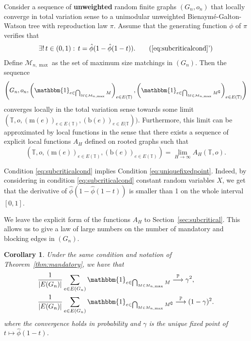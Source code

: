 \documentclass[11pt]{article}
\newtheorem{coro}{Corollary}[section]
\begin{document}
\begin{theorem}\label{thm:mandatory}
    Consider a sequence of \textbf{unweighted} random finite graphs $(G_n,o_n)$ that locally converge in total variation sense to a unimodular unweighted Bienaymé-Galton-Watson tree with reproduction law $\pi$.
    Assume that the generating function $\phi$ of $\pi$ verifies that 
    \begin{equation}
    \exists! \, t \in (0,1): \,
    t = \hat{\phi}(1-\hat{\phi}(1-t)).
    \label{eq:uniquefixedpoint} \tag{\ref{eq:subcriticalcond}'}
    \end{equation}
     Define $\mathcal{M}_{n,\max}$ as the set of maximum size matchings in $(G_n)$. Then the sequence
    \[ \left(G_n,o_n, \left( \mathbbm{1}_{e \in \bigcap_{M \in \mathcal{M}_{n,\max}}M}  \right)_{e\in E(\mathbb T)} , \left( \mathbbm{1}_{e \in \bigcap_{M \in \mathcal{M}_{n,\max}} M^{\complement}} \right)_{e\in E(\mathbb T)}\right)   \]
    converges locally in the total variation sense towards some limit $ (\mathbb T, o, (\mathrm{m}(e))_{e\in E(\mathbb T)}, (\mathrm{b}(e))_{e\in E(\mathbb T}))$. Furthermore, this limit can be approximated by local functions in the sense that there exists a sequence of explicit local functions $A_H$ defined on rooted graphs such that
    \[
    \left( \mathbb T, o, (\mathrm{m}(e))_{e\in E(\mathbb T)}, (\mathrm{b}(e))_{e\in E(\mathbb T)} \right) = \lim_{H \rightarrow \infty} A_H(\mathbb{T},o).
    \]
\end{theorem}
\begin{remark}
    Condition \eqref{eq:subcriticalcond} implies Condition \eqref{eq:uniquefixedpoint}. Indeed, by considering in condition \eqref{eq:subcriticalcond} constant random variables  $X$, we get that the derivative of $\hat{\phi}(1-\hat{\phi}(1-t))$ is smaller than 1 on the whole interval $[0,1]$.
\end{remark}
We leave the explicit form of the functions $A_H$ to Section~\ref{sec:subcritical}. This allows us to give a law of large numbers on the number of mandatory and blocking edges in $(G_n)$. 
\begin{coro} \label{coro:ERmb}
    Under the same condition and notation of Theorem~\ref{thm:mandatory}, we have that
    \begin{align}
        &\frac{1}{|E(G_n)|}\sum_{e \in E(G_n)} \mathbbm{1}_{e \in \bigcap_{M \in M_{n,\max}}M} \overset{\mathbb{P}}{\longrightarrow} \gamma^2, \\
        &\frac{1}{|E(G_n)|} \sum_{e \in E(G_n)} \mathbbm{1}_{e \in \bigcap_{M \in M_{n,\max}}M^{\complement}} \overset{\mathbb{P}}{\longrightarrow} (1-\gamma)^2.
    \end{align}
    where the convergence holds in probability and $\gamma$ is the unique fixed point of $t \mapsto \hat{\phi}(1-t)$.
\end{coro}
\end{document}
